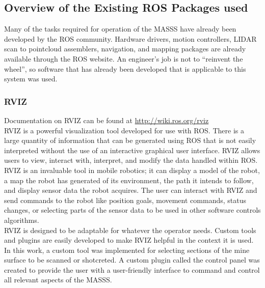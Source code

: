 \subsection{Overview of the Existing ROS Packages used}

Many of the tasks required for operation of the MASSS have already been developed by the ROS community. Hardware drivers, motion controllers, LIDAR scan to pointcloud assemblers, navigation, and mapping packages are already available through the ROS website. An engineer's job is not to ``reinvent the wheel'', so software that has already been developed that is applicable to this system was used.\\
\subsubsection{RVIZ}
\label{sec:rviz}

Documentation on RVIZ can be found at \url{http://wiki.ros.org/rviz}\\

RVIZ is a powerful visualization tool developed for use with ROS. There is a large quantity of information that can be generated using ROS that is not easily interpreted without the use of an interactive graphical user interface. RVIZ allows users to view, interact with, interpret, and modify the data handled within ROS. RVIZ is an invaluable tool in mobile robotics; it can display a model of the robot, a map the robot has generated of its environment, the path it intends to follow, and display sensor data the robot acquires. The user can interact with RVIZ and send commands to the robot like position goals, movement commands, status changes, or selecting parts of the sensor data to be used in other software controls algorithms.\\

RVIZ is designed to be adaptable for whatever the operator needs. Custom tools and plugins are easily developed to make RVIZ helpful in the context it is used. In this work, a custom tool was implemented for selecting sections of the mine surface to be scanned or shotcreted. A custom plugin called the control panel was created to provide the user with a user-friendly interface to command and control all relevant aspects of the MASSS.\\

